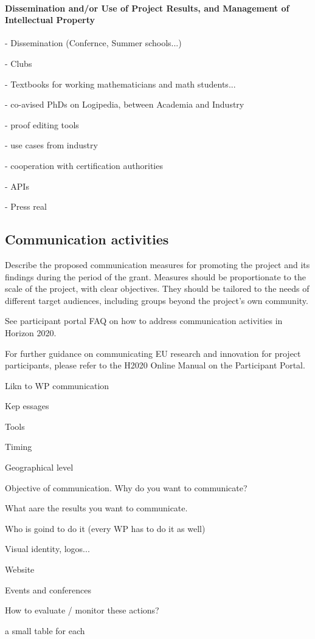 \paragraph*{Dissemination and/or Use of Project Results, and Management of Intellectual Property}\label{sec:dissemination}


- Dissemination  (Confernce, Summer schools...)

- Clubs

- Textbooks for working mathematicians and math students...

- co-avised PhDs on Logipedia, between Academia and Industry

- proof editing tools

- use cases from industry

- cooperation with certification authorities

- APIs

- Press real


\subsection{Communication activities}


\begin{todo}{}\color{red}
  Describe the proposed communication measures for promoting the project and its findings during the period of the grant. Measures should be proportionate to the scale of the project, with clear objectives.  They should be tailored to the needs of different target audiences, including groups beyond the project's own community.

  See participant portal FAQ on how to address communication activities in Horizon 2020.

  For further guidance on communicating EU research and innovation for project participants, please refer to the H2020 Online Manual on the Participant Portal.
\end{todo}

Likn to WP communication

Kep essages

Tools

Timing

Geographical level


Objective of communication. Why do you want to communicate?

What aare the results you want to communicate.

Who is goind to do it (every WP has to do it as well)

Visual identity, logos...

Website

Events and conferences

How to evaluate / monitor these actions?

{\color{red} a small table for each}



